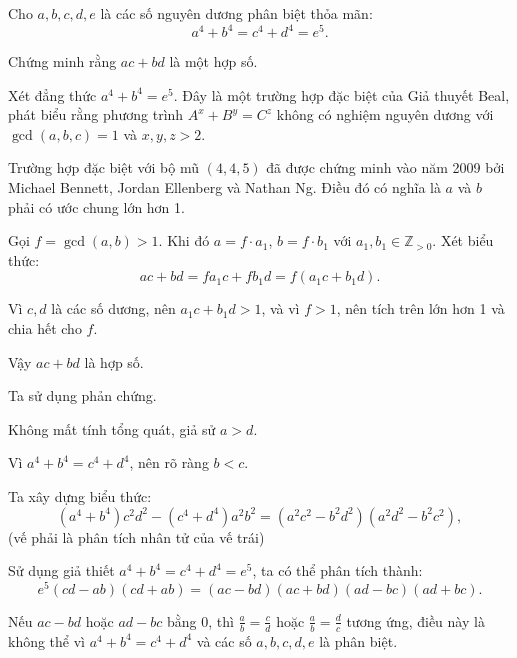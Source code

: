 \ifshowproblemandsoln
\ifshowproblem\begin{problem}\label{problem:USA-2015-MO-P5}\fi
\ifshowsoln\begin{problem}\fi
    Cho \( a, b, c, d, e \) là các số nguyên dương phân biệt thỏa mãn:
    \[
        a^4 + b^4 = c^4 + d^4 = e^5.
    \]

    Chứng minh rằng \( ac + bd \) là một hợp số.
\end{problem}
\fi

\ifshowsoln
\begin{soln}\footnotemark
    Xét đẳng thức \( a^4 + b^4 = e^5 \). Đây là một trường hợp đặc biệt của Giả thuyết Beal, 
    phát biểu rằng phương trình \( A^x + B^y = C^z \) không có nghiệm nguyên dương với \( \gcd(a,b,c) = 1 \) và \( x, y, z > 2 \).

    Trường hợp đặc biệt với bộ mũ \( (4, 4, 5) \) đã được chứng minh vào năm 2009 bởi Michael Bennett, Jordan Ellenberg và Nathan Ng. 
    Điều đó có nghĩa là \( a \) và \( b \) phải có ước chung lớn hơn 1.

    Gọi \( f = \gcd(a, b) > 1 \). Khi đó \( a = f \cdot a_1 \), \( b = f \cdot b_1 \) với \( a_1, b_1 \in \mathbb{Z}_{>0} \). Xét biểu thức:
    \[
        ac + bd = f a_1 c + f b_1 d = f(a_1 c + b_1 d).
    \]

    Vì \( c, d \) là các số dương, nên \( a_1 c + b_1 d > 1 \), và vì \( f > 1 \), nên tích trên lớn hơn 1 và chia hết cho \( f \).

    Vậy \( ac + bd \) là hợp số.
\end{soln}

\begin{soln}\footnotemark
    Ta sử dụng phản chứng.

    Không mất tính tổng quát, giả sử \( a > d \).

    Vì \( a^4 + b^4 = c^4 + d^4 \), nên rõ ràng \( b < c \).

    Ta xây dựng biểu thức:
    \[
        (a^4 + b^4)c^2d^2 - (c^4 + d^4)a^2b^2 = (a^2c^2 - b^2d^2)(a^2d^2 - b^2c^2),
    \]
    (vế phải là phân tích nhân tử của vế trái)

    Sử dụng giả thiết \( a^4 + b^4 = c^4 + d^4 = e^5 \), ta có thể phân tích thành:
    \[
        e^5(cd - ab)(cd + ab) = (ac - bd)(ac + bd)(ad - bc)(ad + bc).
    \]

    Nếu \( ac - bd \) hoặc \( ad - bc \) bằng 0, thì \( \frac{a}{b} = \frac{c}{d} \) hoặc \( \frac{a}{b} = \frac{d}{c} \) tương ứng, 
    điều này là không thể vì \( a^4 + b^4 = c^4 + d^4 \) và các số \( a, b, c, d, e \) là phân biệt.


\end{soln}
\end{problem}
